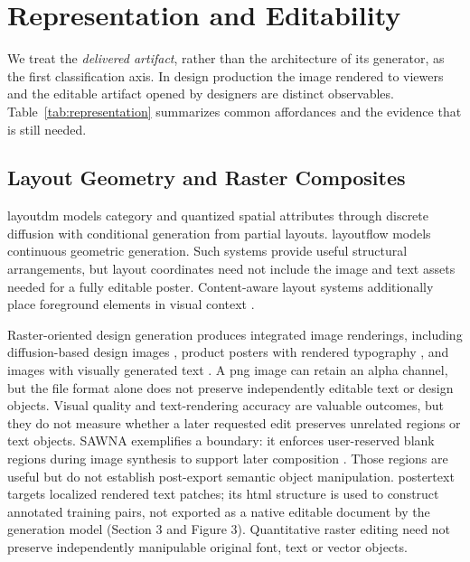\section{Representation and Editability}
\label{sec:representation}
We treat the \emph{delivered artifact}, rather than the architecture of its generator, as the first classification axis.
In design production the image rendered to viewers and the editable artifact opened by designers are distinct observables.
Table~\ref{tab:representation} summarizes common affordances and the evidence that is still needed.



\subsection{Layout Geometry and Raster Composites}
\ac{layoutdm} models category and quantized spatial attributes through discrete diffusion with conditional generation from partial layouts.
\ac{layoutflow} models continuous geometric generation.
Such systems provide useful structural arrangements, but layout coordinates need not include the image and text assets needed for a fully editable poster.
Content-aware layout systems additionally place foreground elements in visual context \citep{cglgan2022,layoutdetr2024}.

Raster-oriented design generation produces integrated image renderings, including diffusion-based design images \citep{designdiffusion2025}, product posters with rendered typography \citep{postermaker2025}, and images with visually generated text \citep{textdiffuser22024}.
A \ac{png} image can retain an alpha channel, but the file format alone does not preserve independently editable text or design objects.
Visual quality and text-rendering accuracy are valuable outcomes, but they do not measure whether a later requested edit preserves unrelated regions or text objects.
SAWNA exemplifies a boundary: it enforces user-reserved blank regions during image synthesis to support later composition \citep{sawna2025}.
Those regions are useful but do not establish post-export semantic object manipulation.
\ac{postertext} targets localized rendered text patches; its \ac{html} structure is used to construct annotated training pairs, not exported as a native editable document by the generation model (Section 3 and Figure 3).
Quantitative raster editing need not preserve independently manipulable original font, text or vector objects.

